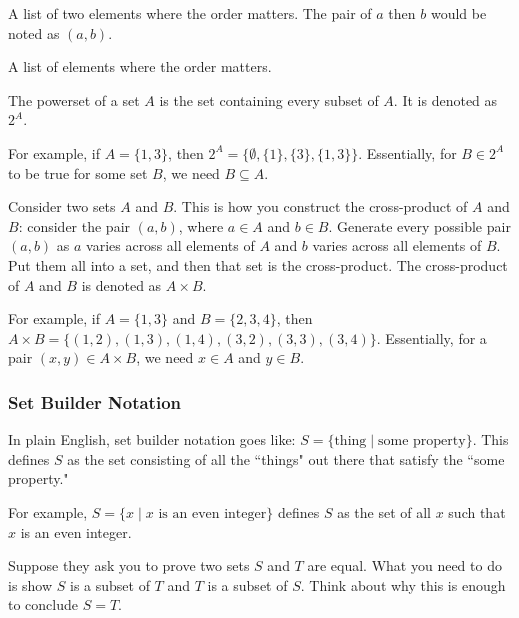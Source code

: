 \documentclass[11pt]{scrartcl}
\begin{document}
\begin{definition}[Pair]
    A list of two elements where the order matters. The pair of $a$ then $b$ would be noted as $(a, b)$.
\end{definition}

\begin{definition}[Tuple]
    A list of elements where the order matters.
\end{definition}

\begin{definition}[Powerset]
The powerset of a set $A$ is the set containing every subset of $A$. It is denoted as $2^A$.
\end{definition}
For example, if $A = \{1, 3\}$, then $2^A = \{\emptyset, \{1\}, \{3\}, \{1, 3\}\}$. Essentially, for $B \in 2^A$ to be true for some set $B$, we need $B \subseteq A$.

\begin{definition}
Consider two sets $A$ and $B$. This is how you construct the cross-product of $A$ and $B$: consider the pair $(a, b)$, where $a \in A$ and $b \in B$. Generate every possible pair $(a, b)$ as $a$ varies across all elements of $A$ and $b$ varies across all elements of $B$. Put them all into a set, and then that set is the cross-product. The cross-product of $A$ and $B$ is denoted as $A \times B$.
\end{definition}
For example, if $A = \{1, 3\}$ and $B = \{2, 3, 4\}$, then $A \times B = \{(1, 2), (1, 3), (1, 4), (3, 2), (3, 3), (3, 4)\}$. Essentially, for a pair $(x, y) \in A \times B$, we need $x \in A$ and $y \in B$.

\subsubsection{Set Builder Notation}

In plain English, set builder notation goes like: $S = \{\text{thing} \mid \text{some property}\}$. This defines $S$ as the set consisting of all the ``things" out there that satisfy the ``some property."

For example, $S = \{x \mid x \text{ is an even integer}\}$ defines $S$ as the set of all $x$ such that $x$ is an even integer.

\begin{advice}
    Suppose they ask you to prove two sets $S$ and $T$ are equal. What you need to do is show $S$ is a subset of $T$ and $T$ is a subset of $S$. Think about why this is enough to conclude $S = T$.
\end{advice}
\end{document}
